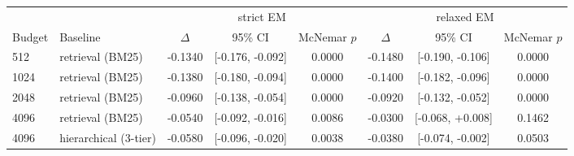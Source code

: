 \begin{tabular}{llcccccc}
\toprule
 & & \multicolumn{3}{c}{strict EM} & \multicolumn{3}{c}{relaxed EM} \\
\cmidrule(lr){3-5}\cmidrule(lr){6-8}
Budget & Baseline & $\Delta$ & 95\% CI & McNemar $p$ & $\Delta$ & 95\% CI & McNemar $p$ \\
\midrule
512 & retrieval (BM25) & -0.1340 & [-0.176, -0.092] & 0.0000 & -0.1480 & [-0.190, -0.106] & 0.0000 \\
1024 & retrieval (BM25) & -0.1380 & [-0.180, -0.094] & 0.0000 & -0.1400 & [-0.182, -0.096] & 0.0000 \\
2048 & retrieval (BM25) & -0.0960 & [-0.138, -0.054] & 0.0000 & -0.0920 & [-0.132, -0.052] & 0.0000 \\
4096 & retrieval (BM25) & -0.0540 & [-0.092, -0.016] & 0.0086 & -0.0300 & [-0.068, +0.008] & 0.1462 \\
4096 & hierarchical (3-tier) & -0.0580 & [-0.096, -0.020] & 0.0038 & -0.0380 & [-0.074, -0.002] & 0.0503 \\
\bottomrule
\end{tabular}